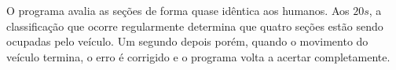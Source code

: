 O programa avalia as seções de forma quase idêntica aos humanos. Aos $20s$, a classificação que ocorre regularmente determina que quatro seções estão sendo ocupadas pelo veículo. Um segundo depois porém, quando o movimento do veículo termina, o erro é corrigido e o programa volta a acertar completamente.











